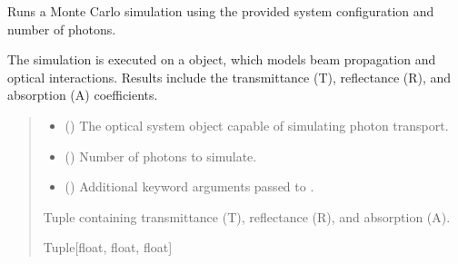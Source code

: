 \documentclass[letterpaper,10pt,english]{sphinxmanual}
\begin{document}
\begin{fulllineitems}
\label{\detokenize{generated/photon_canon.utils:photon_canon.utils.simulate}}
\pysigstartsignatures
\pysiglinewithargsret
{}
{\sphinxparamcomma {}\sphinxparamcomma {}}
{}
\pysigstopsignatures
\sphinxAtStartPar
Runs a Monte Carlo simulation using the provided system configuration and number of photons.

\sphinxAtStartPar
The simulation is executed on a  object, which models beam propagation and optical interactions.
Results include the transmittance (T), reflectance (R), and absorption (A) coefficients.
\begin{quote}\begin{description}
\begin{itemize}
\item {} 
\sphinxAtStartPar
{} ({\hyperref[\detokenize{generated/photon_canon.optics:photon_canon.optics.System}]{}}) \textendash{} The optical system object capable of simulating photon transport.

\item {} 
\sphinxAtStartPar
{} () \textendash{} Number of photons to simulate.

\item {} 
\sphinxAtStartPar
{} () \textendash{} Additional keyword arguments passed to .

\end{itemize}

\sphinxAtStartPar
Tuple containing transmittance (T), reflectance (R), and absorption (A).

\sphinxAtStartPar
Tuple{[}float, float, float{]}

\end{description}\end{quote}

\end{fulllineitems}
\end{document}
